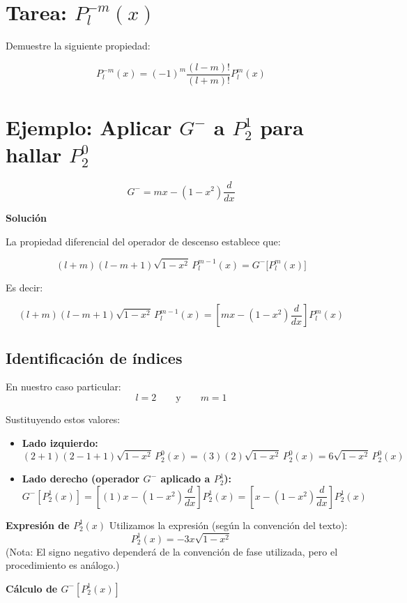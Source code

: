 \documentclass[a4paper]{article}
\begin{document}
\section{Tarea: $P_l^{-m}(x)$}

Demuestre la siguiente propiedad:

$$
P_l^{-m}(x) = (-1)^m \frac{(l-m)!}{(l+m)!} P_l^m(x)
$$


\section{Ejemplo: Aplicar $G^-$ a $P_2^1$ para hallar $P_2^0$}

$$\boxed{G^- = m x - (1 - x^2) \frac{d}{dx}}$$

\textbf{Solución}

La propiedad diferencial del operador de descenso establece que:

$$
(l + m)(l - m + 1) \sqrt{1 - x^2} \, P_l^{m-1}(x) = G^-\big[ P_l^m(x) \big]
$$

Es decir:

$$
(l + m)(l - m + 1) \sqrt{1 - x^2} \, P_l^{m-1}(x) = \left[ m x - (1 - x^2) \frac{d}{dx} \right] P_l^m(x)
$$

\subsection*{Identificación de índices}
En nuestro caso particular:
$$
l = 2 \qquad \text{y} \qquad m = 1
$$

Sustituyendo estos valores:

\begin{itemize}
    \item \textbf{Lado izquierdo:}
    $$
    (2 + 1)(2 - 1 + 1) \sqrt{1 - x^2} \, P_2^{0}(x) = (3)(2) \sqrt{1 - x^2} \, P_2^0(x) = 6 \sqrt{1 - x^2} \, P_2^0(x)
    $$
    
    \item \textbf{Lado derecho (operador $G^-$ aplicado a $P_2^1$):}
    $$
    G^-[P_2^1(x)] = \left[ (1)x - (1 - x^2) \frac{d}{dx} \right] P_2^1(x) = \left[ x - (1 - x^2) \frac{d}{dx} \right] P_2^1(x)
    $$
\end{itemize}

\textbf{Expresión de $P_2^1(x)$}
Utilizamos la expresión (según la convención del texto):
$$
P_2^1(x) = -3x \sqrt{1 - x^2}
$$
(Nota: El signo negativo dependerá de la convención de fase utilizada, pero el procedimiento es análogo.)

\textbf{Cálculo de $G^-[P_2^1(x)]$}
\end{document}
